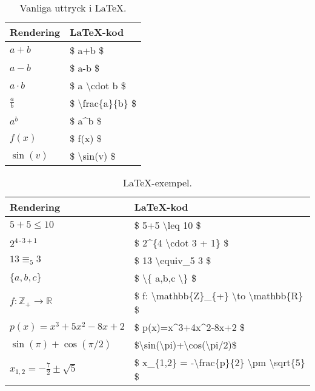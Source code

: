 \documentclass[titlepage]{article}
\begin{document}
\begin{table}
    \begin{center}
        \begin{tabular}{| l | l |}
            \hline
            \textbf{Rendering} & \textbf{\LaTeX-kod} \\
            \hline
            $a+b$ & \$ a+b \$ \\
            \hline
            $a-b$ & \$ a-b \$ \\
            \hline
            $a \cdot b$ & \$ a \textbackslash cdot b \$ \\
            \hline
            $\frac{a}{b}$ & \$ \textbackslash frac\{a\}\{b\} \$ \\
            \hline
            $a^b$ & \$ a\textasciicircum b \$ \\
            \hline
            $f(x)$ & \$ f(x) \$ \\
            \hline
            $\sin(v)$ & \$ \textbackslash sin(v) \$ \\
            \hline
        \end{tabular}
        \caption{Vanliga uttryck i \LaTeX.}
        \label{t2}
    \end{center}
\end{table}

\begin{table}
    \begin{center}
        \begin{tabular}{| l | l |}
            \hline
            \textbf{Rendering} & \textbf{\LaTeX-kod} \\
            \hline
            $5+5 \leq 10$ & \$ 5+5 \textbackslash leq 10 \$ \\
            \hline
            $2^{4\cdot3 + 1}$ & \$ 2\textasciicircum \{4 \textbackslash cdot 3 + 1\} \$ \\
            \hline
            $13 \equiv_5 3$ & \$ 13 \textbackslash equiv\_5 3 \$ \\
            \hline
            $\{a,b,c\}$ & \$ \textbackslash\{ a,b,c \textbackslash\} \$ \\
            \hline
            $f:\mathbb{Z}_{+} \to \mathbb{R}$ & \$ f: \textbackslash mathbb\{Z\}\_\{+\} \textbackslash to \textbackslash mathbb\{R\} \$ \\
            \hline
            $p(x)=x^3+5x^2-8x+2$ & \$ p(x)=x\textasciicircum 3+4x\textasciicircum 2-8x+2 \$ \\
            \hline
            $\sin(\pi)+\cos(\pi/2)$ & \$\textbackslash sin(\textbackslash pi)+\textbackslash cos(\textbackslash pi/2)\$ \\
            \hline
            $x_{1,2} = -\frac{7}{2} \pm \sqrt{5}$ & \$ x\_\{1,2\} = -\textbackslash frac\{p\}\{2\} \textbackslash pm \textbackslash sqrt\{5\} \$ \\
            \hline
        \end{tabular}
        \caption{\LaTeX-exempel.}
        \label{t3}
    \end{center}
\end{table}




\newpage

\end{document}
